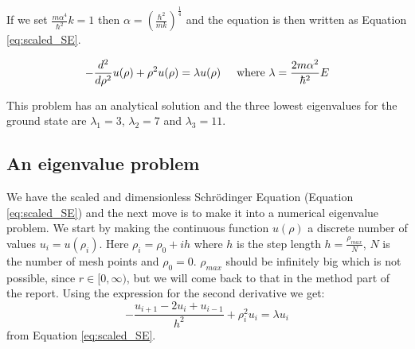 If we set $ \frac{m\alpha^4}{\hbar^2}k = 1$ then $\alpha = \left(\frac{\hbar^2}{mk}\right)^{\frac{1}{4}}$ and the equation is then written as Equation \ref{eq:scaled_SE}.

\begin{equation}\label{eq:scaled_SE}
-\frac{d^2}{d\rho^2}u(\rho ) + \rho^2 u(\rho ) = \lambda u(\rho ) \hspace{0.5cm} \text{where }\lambda = \frac{2m\alpha^2}{\hbar^2}E
\end{equation}

This problem has an analytical solution and the three lowest eigenvalues for the ground state are $\lambda_1 = 3$, $\lambda_2 = 7$ and $\lambda_3 = 11$. 

\subsection{An eigenvalue problem}

We have the scaled and dimensionless Schrödinger Equation (Equation \ref{eq:scaled_SE}) and the next move is to make it into a numerical eigenvalue problem. We start by making the continuous function $u(\rho )$ a discrete number of values $u_i = u(\rho_i)$. Here $\rho_i = \rho_0 + ih$ where $h$ is the step length  $h = \frac{\rho_{max}}{N}$, $N$ is the number of mesh points and $\rho_0 = 0$. $\rho_{max}$ should be infinitely big which is not possible, since $r \in [0, \infty )$, but we will come back to that in the method part of the report. Using the expression for the second derivative we get:
\[
- \frac{u_{i+1} - 2u_i + u_{i-1}}{h^2} + \rho_i^2 u_i = \lambda u_i
\]
from Equation \ref{eq:scaled_SE}.

